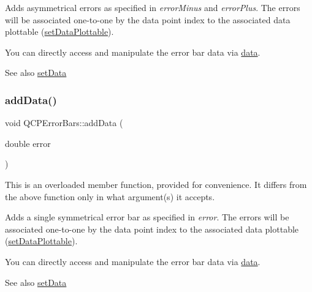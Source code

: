 Adds asymmetrical errors as specified in {\itshape error\+Minus} and {\itshape error\+Plus}. The errors will be associated one-\/to-\/one by the data point index to the associated data plottable (\hyperlink{class_q_c_p_error_bars_aabb42a964cfbf780cd1c79850c7cd989}{set\+Data\+Plottable}).

You can directly access and manipulate the error bar data via \hyperlink{class_q_c_p_error_bars_aeebd1b14f4c3573565efafd514988813}{data}.

\begin{DoxySeeAlso}{See also}
\hyperlink{class_q_c_p_error_bars_a92b1980003255f5f7c05407a4d92aabc}{set\+Data} 
\end{DoxySeeAlso}
\mbox{\label{class_q_c_p_error_bars_a39ef73b0e61941fc4064fd3a5224c72a}} 
\subsubsection{\texorpdfstring{add\+Data()}{addData()}\hspace{0.1cm}{\footnotesize\ttfamily [3/4]}}
{\footnotesize\ttfamily void Q\+C\+P\+Error\+Bars\+::add\+Data (\begin{DoxyParamCaption}\item[{double}]{error }\end{DoxyParamCaption})}

This is an overloaded member function, provided for convenience. It differs from the above function only in what argument(s) it accepts.

Adds a single symmetrical error bar as specified in {\itshape error}. The errors will be associated one-\/to-\/one by the data point index to the associated data plottable (\hyperlink{class_q_c_p_error_bars_aabb42a964cfbf780cd1c79850c7cd989}{set\+Data\+Plottable}).

You can directly access and manipulate the error bar data via \hyperlink{class_q_c_p_error_bars_aeebd1b14f4c3573565efafd514988813}{data}.

\begin{DoxySeeAlso}{See also}
\hyperlink{class_q_c_p_error_bars_a92b1980003255f5f7c05407a4d92aabc}{set\+Data} 
\end{DoxySeeAlso}
\mbox{\label{class_q_c_p_error_bars_a1833c5de9c2fe2952b977505d9f27cd1}} 
